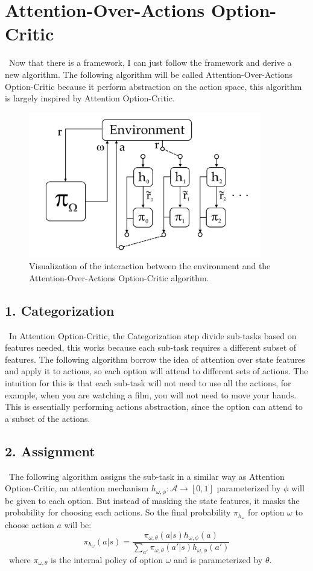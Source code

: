\documentclass{article}
\begin{document}
	\section{Attention-Over-Actions Option-Critic}
	\qquad \ Now that there is a framework, I can just follow the framework and derive a new algorithm. The following algorithm will be called Attention-Over-Actions Option-Critic because it perform abstraction on the action space, this algorithm is largely inspired by Attention Option-Critic.
	\begin{figure}[h]
		\centering
		\includegraphics[width=4in]{aoaoc.png}
		\caption{Visualization of the interaction between the environment and the Attention-Over-Actions Option-Critic algorithm.}
	\end{figure}
	\subsection*{1. Categorization}
	\qquad \ In Attention Option-Critic, the Categorization step divide sub-tasks based on features needed, this works because each sub-task requires a different subset of features. The following algorithm borrow the idea of attention over state features and apply it to actions, so each option will attend to different sets of actions. The intuition for this is that each sub-task will not need to use all the actions, for example, when you are watching a film, you will not need to move your hands. This is essentially performing actions abstraction, since the option can attend to a subset of the actions.
	\subsection*{2. Assignment}
	\qquad \ The following algorithm assigns the sub-task in a similar way as Attention Option-Critic, an attention mechanism $h_{\omega,\phi}:\mathcal{A} \rightarrow [0,1]$ parameterized by $\phi$ will be given to each option. But instead of masking the state features, it masks the probability for choosing each actions. So the final probability $\pi_{h_\omega}$ for option $\omega$ to choose action $a$ will be: $$\pi_{h_\omega}(a|s) = \frac{\pi_{\omega,\theta}(a|s)h_{\omega, \phi}(a)}{\sum_{a'} \pi_{\omega,\theta}(a'|s)h_{\omega, \phi}(a')}$$ \qquad \ where $\pi_{\omega,\theta}$ is the internal policy of option $\omega$ and is parameterized by $\theta$.
	
\end{document}
